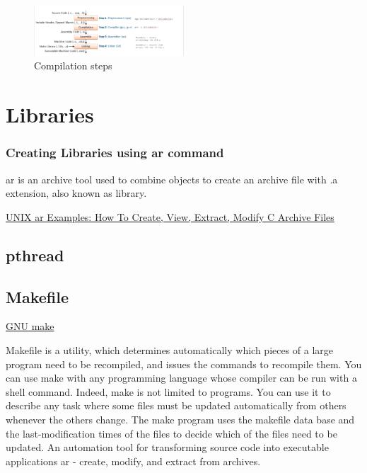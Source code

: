 \label{sec:figures}
\begin{figure}[h]
\caption{Compilation steps}
\centering
\includegraphics[width=0.5\textwidth]{./build/compilation_steps.pdf}
\end{figure}


\section{Libraries} 

\subsubsection*{Creating Libraries using ar command}%
\label{ssub:creating_libraries_using_ar_command}
ar is an archive tool used to combine objects to create an archive file with .a extension, also known as library.

\href{https://www.thegeekstuff.com/2010/08/ar-command-examples/}{UNIX ar Examples: How To Create, View, Extract, Modify C Archive Files} 

\subsection{pthread} 

\subsection{Makefile} 
\href{https://www.gnu.org/software/make/manual/make.html\#toc-Overview-of-make} {GNU make}

Makefile is a utility, which determines automatically which pieces of a large program need to be recompiled, and issues the commands to recompile them.
You can use make with any programming language whose compiler can be run with a shell command. Indeed, make is not limited to programs. You can use it to describe any task where some files must be updated automatically from others whenever the others change.
The make program uses the makefile data base and the last-modification times of the files to decide which of the files need to be updated.
An automation tool for transforming source code into executable  applications 
ar - create, modify, and extract from archives. 

